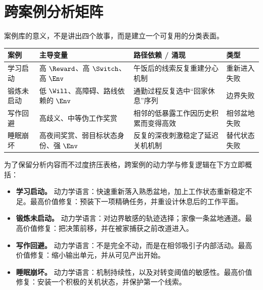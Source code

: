 \section{跨案例分析矩阵}

案例库的意义，不是讲出四个故事，而是建立一个可复用的分类表面。

\begin{center}
\begin{tabularx}{\textwidth}{@{}l l X X@{}}
\toprule
案例 & 主导变量 & 路径依赖 / 涌现 & 类型 \\
\midrule
学习启动 &
高 $\Reward$、高 $\Switch$、高 $\Env$ &
午饭后的线索反复重建分心机制 &
重新进入失败 \\

锻炼未启动 &
低 $\Will$、高障碍、路线依赖的 $\Env$ &
通勤过程反复选中“回家休息”序列 &
边界失败 \\

写作回避 &
高歧义、中等伪工作奖赏 &
相邻的低暴露工作因历史积累而变得高效 &
相邻盆地失败 \\

睡眠崩坏 &
高夜间奖赏、弱目标状态身份、强 $\Env$ &
反复的深夜刺激稳定了延迟关机机制 &
替代状态失败 \\
\bottomrule
\end{tabularx}
\end{center}

为了保留分析内容而不过度挤压表格，跨案例的动力学与修复逻辑在下方立即概括：

\begin{itemize}[nosep]
  \item \textbf{学习启动。} 动力学语言：快速重新落入熟悉盆地，加上工作状态重新稳定不足。最高价值修复：预装下一项精确任务，并重设计休息后的工作平面。
  \item \textbf{锻炼未启动。} 动力学语言：对边界敏感的轨迹选择；家像一条盆地通道。最高价值修复：把决策前移，并在被家捕获之前改道进入。
  \item \textbf{写作回避。} 动力学语言：不是完全不动，而是在相邻吸引子内部活动。最高价值修复：缩小输出单元，并从可见产出开始。
  \item \textbf{睡眠崩坏。} 动力学语言：机制持续性，以及对转变阈值的敏感性。最高价值修复：安装一个积极的关机状态，并保护第一个线索。
\end{itemize}